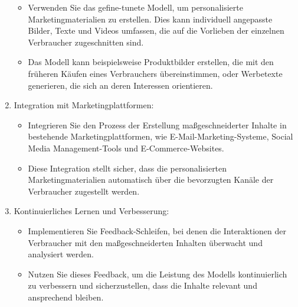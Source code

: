 \documentclass[12pt,ngerman]{AssignmentClass}
\begin{document}
\begin{enumerate}
                \begin{itemize}
                    \item Verwenden Sie das gefine-tunete Modell, um personalisierte Marketingmaterialien zu erstellen. Dies kann individuell angepasste Bilder, Texte und Videos umfassen, die auf die Vorlieben der einzelnen Verbraucher zugeschnitten sind.
                    \item Das Modell kann beispielsweise Produktbilder erstellen, die mit den früheren Käufen eines Verbrauchers übereinstimmen, oder Werbetexte generieren, die sich an deren Interessen orientieren.
                \end{itemize}
            \item Integration mit Marketingplattformen:
                \begin{itemize}
                    \item Integrieren Sie den Prozess der Erstellung maßgeschneiderter Inhalte in bestehende Marketingplattformen, wie E-Mail-Marketing-Systeme, Social Media Management-Tools und E-Commerce-Websites.
                    \item Diese Integration stellt sicher, dass die personalisierten Marketingmaterialien automatisch über die bevorzugten Kanäle der Verbraucher zugestellt werden.
                \end{itemize}
            \item Kontinuierliches Lernen und Verbesserung:
                \begin{itemize}
                    \item Implementieren Sie Feedback-Schleifen, bei denen die Interaktionen der Verbraucher mit den maßgeschneiderten Inhalten überwacht und analysiert werden.
                    \item Nutzen Sie dieses Feedback, um die Leistung des Modells kontinuierlich zu verbessern und sicherzustellen, dass die Inhalte relevant und ansprechend bleiben.
                \end{itemize}
        \end{enumerate}
\end{document}
